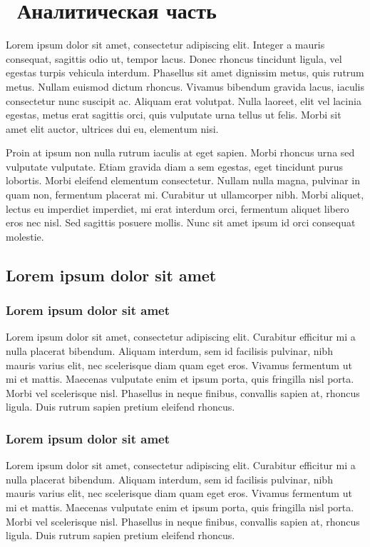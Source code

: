 \chapter{ Аналитическая часть}
\label{cha:analysis}
%
%
Lorem ipsum dolor sit amet, consectetur adipiscing elit. Integer a mauris consequat, sagittis odio ut, tempor lacus. Donec rhoncus tincidunt ligula, vel egestas turpis vehicula interdum. Phasellus sit amet dignissim metus, quis rutrum metus. Nullam euismod dictum rhoncus. Vivamus bibendum gravida lacus, iaculis consectetur nunc suscipit ac. Aliquam erat volutpat. Nulla laoreet, elit vel lacinia egestas, metus erat sagittis orci, quis vulputate urna tellus ut felis. Morbi sit amet elit auctor, ultrices dui eu, elementum nisi.

Proin at ipsum non nulla rutrum iaculis at eget sapien. Morbi rhoncus urna sed vulputate vulputate. Etiam gravida diam a sem egestas, eget tincidunt purus lobortis. Morbi eleifend elementum consectetur. Nullam nulla magna, pulvinar in quam non, fermentum placerat mi. Curabitur ut ullamcorper nibh. Morbi aliquet, lectus eu imperdiet imperdiet, mi erat interdum orci, fermentum aliquet libero eros nec nisl. Sed sagittis posuere mollis. Nunc sit amet ipsum id orci consequat molestie.




\section{Lorem ipsum dolor sit amet}
\subsection{Lorem ipsum dolor sit amet}
Lorem ipsum dolor sit amet, consectetur adipiscing elit. Curabitur efficitur mi a nulla placerat bibendum. Aliquam interdum, sem id facilisis pulvinar, nibh mauris varius elit, nec scelerisque diam quam eget eros. Vivamus fermentum ut mi et mattis. Maecenas vulputate enim et ipsum porta, quis fringilla nisl porta. Morbi vel scelerisque nisl. Phasellus in neque finibus, convallis sapien at, rhoncus ligula. Duis rutrum sapien pretium eleifend rhoncus.

\subsection{Lorem ipsum dolor sit amet}
Lorem ipsum dolor sit amet, consectetur adipiscing elit. Curabitur efficitur mi a nulla placerat bibendum. Aliquam interdum, sem id facilisis pulvinar, nibh mauris varius elit, nec scelerisque diam quam eget eros. Vivamus fermentum ut mi et mattis. Maecenas vulputate enim et ipsum porta, quis fringilla nisl porta. Morbi vel scelerisque nisl. Phasellus in neque finibus, convallis sapien at, rhoncus ligula. Duis rutrum sapien pretium eleifend rhoncus.


